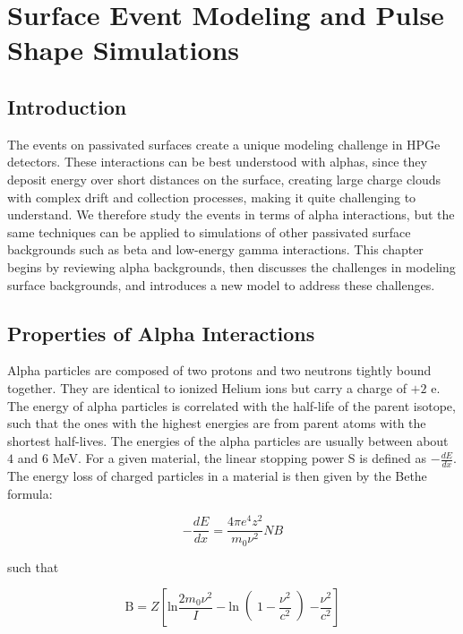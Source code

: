 \chapter{Surface Event Modeling and Pulse Shape Simulations}

\section{Introduction}

The events on passivated surfaces create a unique modeling challenge in HPGe detectors. These interactions can be best understood with alphas, since they deposit energy over short distances on the surface, creating large charge clouds with complex drift and collection processes, making it quite challenging to understand. We therefore study the events in terms of alpha interactions, but the same techniques can be applied to simulations of other passivated surface backgrounds such as beta and low-energy gamma interactions. This chapter begins by reviewing alpha backgrounds, then discusses the challenges in modeling surface backgrounds, and introduces a new model to address these challenges.


\section{Properties of Alpha Interactions}
Alpha particles are composed of two protons and two neutrons tightly bound together. They are identical to ionized Helium ions but carry a charge of $+2$ e. The energy of alpha particles is correlated with the half-life of the parent isotope, such that the ones with the highest energies are from parent atoms with the shortest half-lives. The energies of the alpha particles are usually between about $4$ and $6$ MeV. For a given material, the linear stopping power S is defined as $-\frac{dE}{dx}$. The energy loss of charged particles in a material is then given by the Bethe formula:

\begin{equation}\label{bethe_formula}
    -\frac{dE}{dx} = \frac{4\pi e^4z^2}{m_0\nu^2}NB
\end{equation}

such that

\begin{equation}\label{bethe_B}
    \text{B}=Z\left[ \text{ln}\frac{2m_0\nu^2}{I}-\text{ln}\right(1-\frac{\nu^2}{c^2}\left)-\frac{\nu^2}{c^2}\right]
\end{equation}

